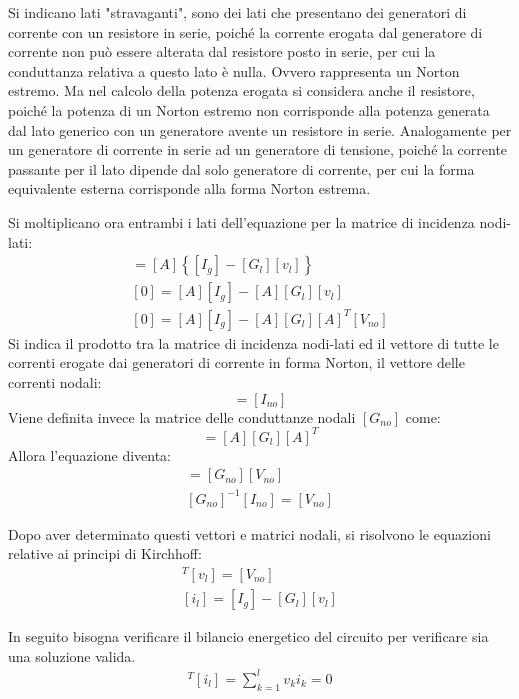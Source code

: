 \documentclass{article}
\numberwithin{equation}{subsection}
\begin{document}
Si indicano lati "stravaganti", sono dei lati che presentano dei generatori di corrente con un resistore in serie, poiché la corrente erogata dal generatore di corrente non può 
essere alterata dal resistore posto in serie, per cui la conduttanza relativa a questo lato è nulla. Ovvero rappresenta un Norton estremo. Ma nel calcolo della potenza 
erogata si considera anche il resistore, poiché la potenza di un Norton estremo non corrisponde alla potenza generata dal lato generico con un generatore avente un resistore in 
serie. 
Analogamente per un generatore di corrente in serie ad un generatore di tensione, poiché la corrente passante per il lato dipende dal solo generatore di corrente, per cui la 
forma equivalente esterna corrisponde alla forma Norton estrema. 

Si moltiplicano ora entrambi i lati dell'equazione per la matrice di incidenza nodi-lati:
\begin{gather*}
    [A][i_l]=[A]\left\{[I_g]-[G_l][v_l]\right\}\\
    [0]=[A][I_g]-[A][G_l][v_l]\\
    [0]=[A][I_g]-[A][G_l][A]^T[V_{no}]
\end{gather*}
Si indica il prodotto tra la matrice di incidenza nodi-lati ed il vettore di tutte le correnti erogate dai generatori di corrente in forma Norton, il vettore delle correnti 
nodali:
\begin{equation*}
    [A][I_g]=[I_{no}]
\end{equation*}
Viene definita invece la matrice delle conduttanze nodali $[G_{no}]$ come:
\begin{equation*}
    [G_{no}]=[A][G_l][A]^T
\end{equation*}
Allora l'equazione diventa:
\begin{gather*}
    [I_{no}]=[G_{no}][V_{no}]\\
    [G_{no}]^{-1}[I_{no}]=[V_{no}]
\end{gather*}

Dopo aver determinato questi vettori e matrici nodali, si risolvono le equazioni relative ai principi di Kirchhoff: 
\begin{gather*}
    [A]^T[v_l]=[V_{no}]\\
    [i_l]=[I_g]-[G_l][v_l]
\end{gather*}

In seguito bisogna verificare il bilancio energetico del circuito per verificare sia una soluzione valida. 
\begin{gather*}
    [v_l]^T[i_l]=\displaystyle\sum_{k=1}^lv_ki_k=0
\end{gather*}
\end{document}
